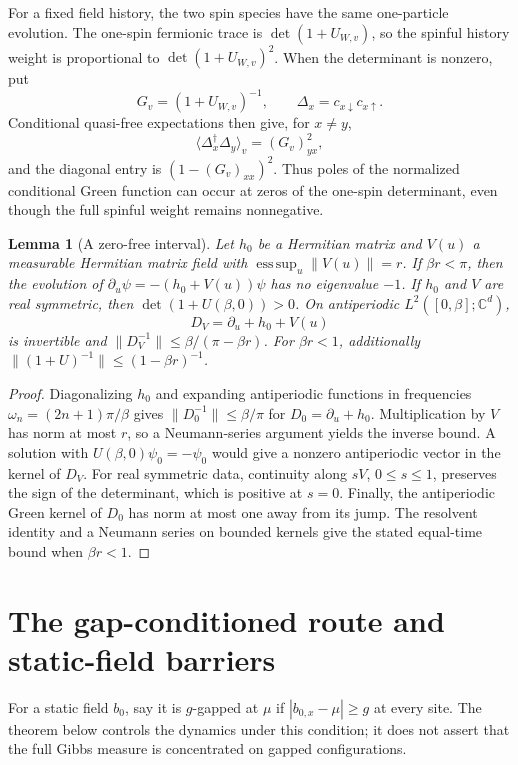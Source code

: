 \documentclass[11pt]{article}
\newtheorem{lemma}[theorem]{Lemma}
\theoremstyle{definition}
\theoremstyle{remark}
\newcommand{\C}{\mathbb{C}}
\begin{document}
For a fixed field history, the two spin species have the same one-particle evolution. The one-spin fermionic trace is $\det(1+U_{W,v})$, so the spinful history weight is proportional to $\det(1+U_{W,v})^2$. When the determinant is nonzero, put
\[
 G_v=(1+U_{W,v})^{-1},\qquad \Delta_x=c_{x\downarrow}c_{x\uparrow}.
\]
Conditional quasi-free expectations then give, for $x\ne y$,
\begin{equation}\label{eq:pairwick}
 \langle\Delta_x^\dagger\Delta_y\rangle_v=(G_v)_{yx}^2,
\end{equation}
and the diagonal entry is $(1-(G_v)_{xx})^2$. Thus poles of the normalized conditional Green function can occur at zeros of the one-spin determinant, even though the full spinful weight remains nonnegative.

\begin{lemma}[A zero-free interval]\label{lem:pi}
Let $h_0$ be a Hermitian matrix and $V(u)$ a measurable Hermitian matrix field with $\operatorname*{ess\,sup}_u\|V(u)\|=r$. If $\beta r<\pi$, then the evolution of $\partial_u\psi=-(h_0+V(u))\psi$ has no eigenvalue $-1$. If $h_0$ and $V$ are real symmetric, then $\det(1+U(\beta,0))>0$. On antiperiodic $L^2([0,\beta];\C^d)$,
\[
 D_V=\partial_u+h_0+V(u)
\]
is invertible and $\|D_V^{-1}\|\leq\beta/(\pi-\beta r)$. For $\beta r<1$, additionally $\|(1+U)^{-1}\|\leq(1-\beta r)^{-1}$.
\end{lemma}

\begin{proof}
Diagonalizing $h_0$ and expanding antiperiodic functions in frequencies $\omega_n=(2n+1)\pi/\beta$ gives $\|D_0^{-1}\|\leq\beta/\pi$ for $D_0=\partial_u+h_0$. Multiplication by $V$ has norm at most $r$, so a Neumann-series argument yields the inverse bound. A solution with $U(\beta,0)\psi_0=-\psi_0$ would give a nonzero antiperiodic vector in the kernel of $D_V$. For real symmetric data, continuity along $sV$, $0\leq s\leq1$, preserves the sign of the determinant, which is positive at $s=0$. Finally, the antiperiodic Green kernel of $D_0$ has norm at most one away from its jump. The resolvent identity and a Neumann series on bounded kernels give the stated equal-time bound when $\beta r<1$.
\end{proof}

\section{The gap-conditioned route and static-field barriers}

For a static field $b_0$, say it is $g$-gapped at $\mu$ if $|b_{0,x}-\mu|\geq g$ at every site. The theorem below controls the dynamics under this condition; it does not assert that the full Gibbs measure is concentrated on gapped configurations.
\end{document}
